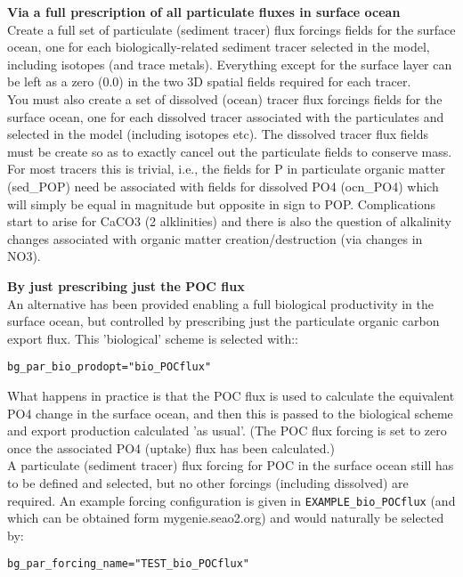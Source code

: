 \documentclass[10pt,twoside]{article}
\begin{document}
\begin{compactenum}

	\item \textbf{Via a full prescription of all particulate fluxes in surface ocean}
		\\Create a full set of particulate (sediment tracer) flux forcings fields for the surface ocean, one for each biologically-related sediment tracer selected in the model, including isotopes (and trace metals). Everything except for the surface layer can be left as a zero (0.0) in the two 3D spatial fields required for each tracer.
  	\\You must also create a set of dissolved (ocean) tracer flux forcings fields for the surface ocean, one for each dissolved tracer associated with the particulates and selected in the model (including isotopes etc). The dissolved tracer flux fields must be create so as to exactly cancel out the particulate fields to conserve mass. For most tracers this is trivial, i.e., the fields for P in particulate organic matter (sed\_POP) need be associated with fields for dissolved PO4 (ocn\_PO4) which will simply be equal in magnitude but opposite in sign to POP. Complications start to arise for CaCO3 (2 alklinities) and there is also the question of alkalinity changes associated with organic matter creation/destruction (via changes in NO3).
	
	\item \textbf{By just prescribing just the POC flux}
		\\An alternative has been provided enabling a full biological productivity in the surface ocean, but controlled by prescribing just the particulate organic carbon export flux. This 'biological' scheme is selected with::
\vspace{-5.5pt}\begin{verbatim}bg_par_bio_prodopt="bio_POCflux"\end{verbatim}\vspace{-5.5pt}
What happens in practice is that the POC flux is used to calculate the equivalent PO4 change in the surface ocean, and then this is passed to the biological scheme and export production calculated 'as usual'. (The POC flux forcing is set to zero once the associated PO4 (uptake) flux has been calculated.)
		\\A particulate (sediment tracer) flux forcing for POC in the surface ocean still has to be defined and selected, but no other forcings (including dissolved) are required. An example forcing configuration is given in \texttt{EXAMPLE\_bio\_POCflux} (and which can be obtained form mygenie.seao2.org) and would naturally be selected by:
\vspace{-5pt}\begin{verbatim}bg_par_forcing_name="TEST_bio_POCflux"\end{verbatim}\vspace{-5pt}


\end{compactenum}
\end{document}
